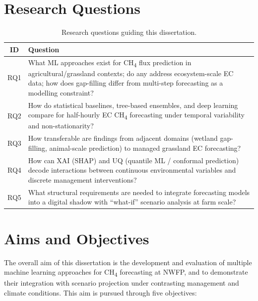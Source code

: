 \section{Research Questions}

\begin{table}[h]
\centering
\begin{tabular}{cp{11cm}}
\toprule
ID & Question \\
\midrule
RQ1 & What ML approaches exist for CH\textsubscript{4} flux prediction in agricultural/grassland
contexts; do any address ecosystem-scale EC data; how does gap-filling differ from multi-step
forecasting as a modelling constraint? \\
RQ2 & How do statistical baselines, tree-based ensembles, and deep learning compare for
half-hourly EC CH\textsubscript{4} forecasting under temporal variability and non-stationarity? \\
RQ3 & How transferable are findings from adjacent domains (wetland gap-filling, animal-scale
prediction) to managed grassland EC forecasting? \\
RQ4 & How can XAI (SHAP) and UQ (quantile ML / conformal prediction) decode interactions between
continuous environmental variables and discrete management interventions? \\
RQ5 & What structural requirements are needed to integrate forecasting models into a digital
shadow with ``what-if'' scenario analysis at farm scale? \\
\bottomrule
\end{tabular}
\caption{Research questions guiding this dissertation.}
\end{table}

\section{Aims and Objectives}

The overall aim of this dissertation is the development and evaluation of multiple machine
learning approaches for CH\textsubscript{4} forecasting at NWFP, and to demonstrate their
integration with scenario projection under contrasting management and climate conditions. This
aim is pursued through five objectives:


